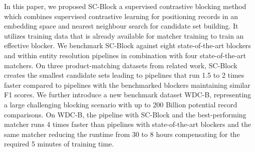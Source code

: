 \documentclass[sigconf,nonacm]{acmart}
\begin{document}
In this paper, we proposed SC-Block a supervised contrastive blocking method which combines supervised contrastive learning for positioning records in an embedding space and nearest neighbour search for candidate set building. It utilizes training data that is already available for matcher training to train an effective blocker.
We benchmark SC-Block against eight state-of-the-art blockers and within entity resolution pipelines in combination with four state-of-the-art matchers.
On three product-matching datasets from related work, SC-Block creates the smallest candidate sets leading to pipelines that run 1.5 to 2 times faster compared to pipelines with the benchmarked blockers maintaining similar F1 scores.
We further introduce a new benchmark dataset WDC-B, representing a large challenging blocking scenario with up to 200 Billion potential record comparisons.
On WDC-B, the pipeline with SC-Block and the best-performing matcher runs 4 times faster than pipelines with state-of-the-art blockers and the same matcher reducing the runtime from 30 to 8 hours compensating for the required 5 minutes of training time. 
 


\end{document}
